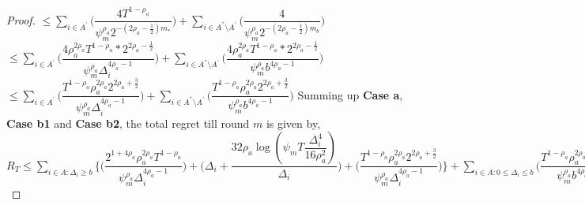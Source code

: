 \begin{proof}
\newline
\hspace*{0em}$\leq\sum_{i\in A^{'}}\bigg(\dfrac{4T^{1-\rho_{a}}}{\psi_{m}^{\rho_{a}}2^{-(2\rho_{a}-\frac{1}{2})m_{*}}} \bigg)+\sum_{i\in A^{''}\setminus A^{'}}\bigg(\dfrac{4}{\psi_{m}^{\rho_{a}}2^{-(2\rho_{a}-\frac{1}{2})m_{b}}} \bigg)$
\newline
\hspace*{0em}$\leq\sum_{i\in A^{'}}\bigg(\dfrac{4\rho_{a}^{2\rho_{a}}T^{1-\rho_{a}}*2^{2\rho_{a}-\frac{1}{2}}}{\psi_{m}^{\rho_{a}}\Delta_{i}^{4\rho_{a}-1}} \bigg)+\sum_{i\in A^{''}\setminus A^{'}}\bigg(\dfrac{4\rho_{a}^{2\rho_{a}}T^{1-\rho_{a}}*2^{2\rho_{a}-\frac{1}{2}}}{\psi_{m}^{\rho_{a}}b^{4\rho_{a}-1}} \bigg)$
\newline
\hspace*{0em}$\leq\sum_{i\in A^{'}}\bigg(\dfrac{T^{1-\rho_{a}}\rho_{a}^{2\rho_{a}}2^{2\rho_{a}+\frac{3}{2}}}{\psi_{m}^{\rho_{a}}\Delta_{i}^{4\rho_{a}-1}} \bigg)+\sum_{i\in A^{''}\setminus A^{'}}\bigg(\dfrac{T^{1-\rho_{a}}\rho_{a}^{2\rho_{a}}2^{2\rho_{a}+\frac{3}{2}}}{\psi_{m}^{\rho_{a}}b^{4\rho_{a}-1}} \bigg)$
\newline
Summing up \textbf{Case a}, \textbf{Case b1} and \textbf{Case b2}, the total regret till round $m$ is given by,
\newline $R_{T}\leq \sum\limits_{i\in A:\Delta_{i}\geq b}\bigg\lbrace\bigg(\dfrac{2^{1+4\rho_{a}}\rho_{a}^{2\rho_{a}}T^{1-\rho_{a}}}{\psi_{m}^{\rho_{a}}\Delta_{i}^{4\rho_{a}-1}}\bigg) + \bigg(\Delta_{i}+\dfrac{32\rho_{a}\log{(\psi_{m}T\dfrac{\Delta_{i}^{4}}{16\rho_{a}^{2}})}}{\Delta_{i}}\bigg)  +  \bigg(\dfrac{T^{1-\rho_{a}}\rho_{a}^{2\rho_{a}}2^{2\rho_{a}+\frac{3}{2}}}{\psi_{m}^{\rho_{a}}\Delta_{i}^{4\rho_{a} -1}} \bigg) \bigg \rbrace+\sum\limits_{i\in A:0\leq\Delta_{i}\leq b}\bigg(\dfrac{T^{1-\rho_{a}}\rho_{a}^{2\rho_{a}}2^{2\rho_{a}+\frac{3}{2}}}{\psi_{m}^{\rho_{a}}b^{4\rho_{a} -1}} \bigg) + max_{i:\Delta_{i}\leq b}\Delta_{i}T$
\end{proof}

